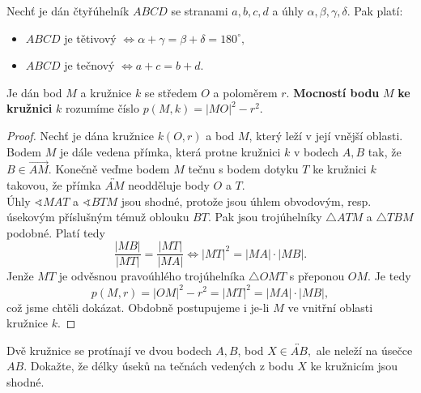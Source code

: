 \begin{veta}
  Nechť je dán čtyřúhelník $ABCD$ se stranami $a,b,c,d$ a úhly $\alpha, \beta, \gamma, \delta.$ Pak platí:
  \begin{itemize}
    \item $ABCD$ je tětivový $\iff \alpha + \gamma=\beta+\delta=180^\circ,$
    \item $ABCD$ je tečnový $\iff a+c=b+d.$
  \end{itemize}
\end{veta}

\begin{definition}
  Je dán bod $M$ a kružnice $k$ se středem $O$ a poloměrem $r$. \textbf{Mocností bodu} $M$ \textbf{ke kružnici} $k$ rozumíme číslo $p(M, k) = |MO|^2-r^2.$
\end{definition}


\begin{proof}
Nechť je dána kružnice $k(O,r)$ a bod $M$, který leží v její vnější oblasti. Bodem $M$ je dále
vedena přímka, která protne kružnici $k$ v bodech $A,B$ tak, že $B\in \overrightarrow{AM}$.
Konečně veďme bodem $M$ tečnu s bodem dotyku $T$ ke kružnici $k$ takovou, že přímka
$\overleftrightarrow{AM}$ neodděluje body $O$ a $T$.\\
Úhly $\sphericalangle MAT$ a $\sphericalangle BTM$ jsou shodné, protože jsou úhlem obvodovým, resp.
úsekovým příslušným témuž oblouku $BT$. Pak jsou trojúhelníky $\triangle ATM$ a $\triangle TBM$ podobné.
Platí tedy
$$\frac{|MB|}{|MT|}=\frac{|MT|}{|MA|} \iff |MT|^2=|MA|\cdot |MB|.$$
Jenže $MT$ je odvěsnou pravoúhlého trojúhelníka $\triangle OMT$ s přeponou $OM$. Je tedy
$$p(M,r)=|OM|^2-r^2=|MT|^2=|MA|\cdot |MB|,$$
což jsme chtěli dokázat.
Obdobně postupujeme i je-li $M$ ve vnitřní oblasti kružnice $k$.
\end{proof}


\begin{priklad}
Dvě kružnice se protínají ve dvou bodech $A,B$, bod $X \in \overleftrightarrow{AB},$
ale neleží na úsečce $AB$. Dokažte, že délky úseků na tečnách vedených z bodu $X$
ke kružnicím jsou shodné.
\end{priklad}

